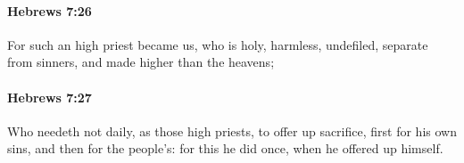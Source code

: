 		\paragraph{Hebrews 7:26} %
			\label{HEBREWS-7-26}

			For such an high priest became us, who is holy, harmless, undefiled, separate from sinners, and made higher than the heavens;

			\begin{framed}
			\scriptsize
				\begin{compactdesc}
					\item[SBLG] 
				\end{compactdesc}
			\end{framed}

		\paragraph{Hebrews 7:27} %
			\label{HEBREWS-7-27}

			Who needeth not daily, as those high priests, to offer up sacrifice, first for his own sins, and then for the people's: for this he did once, when he offered up himself.

